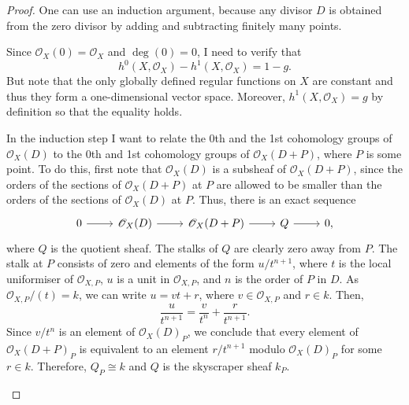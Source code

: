 \begin{proof}
  One can use an induction argument, because any divisor $D$ is
  obtained from the zero divisor by adding and subtracting finitely
  many points.

  \begin{description}[style=nextline]
    \item[base case$\big)$]
          Since $\mathscr{O}_X(0)=\mathscr{O}_{X}$ and $\deg(0)=0$,
          I need to verify that
          \[h^{0}(X, \mathscr{O}_{X})-h^{1}(X, \mathscr{O}_{X})=1-g.\]
          But note that the only globally defined regular functions
          on $X$ are constant and thus they form a one-dimensional vector
          space. Moreover, $h^{1}(X, \mathscr{O}_{X})=g$ by definition
          so that the equality holds.
    \item[induction step$\big)$]
          In the induction step I want to relate the 0th and the 1st
          cohomology groups of $\mathscr{O}_X(D)$ to the 0th and
          1st cohomology groups of $\mathscr{O}_X(D+P)$, where
          $P$ is some point. To do this, first note that
          $\mathscr{O}_X(D)$ is a subsheaf of $\mathscr{O}_X(D+P)$, since
          the orders of the sections of $\mathscr{O}_X(D+P)$ at $P$ are
          allowed to be smaller than the orders of the sections of
          $\mathscr{O}_X(D)$ at $P$. Thus, there is an exact sequence
          \[
          \begin{tikzcd}
            0\arrow{r} & \mathscr{O}_X(D)\arrow{r} & \mathscr{O}_X(D+P)\arrow{r}
            & Q\arrow{r} & 0,
          \end{tikzcd}
          \]
          where $Q$ is the quotient sheaf. The stalks of $Q$ are clearly
          zero away from $P$. The stalk at $P$ consists of zero and
          elements of the form $u/t^{n+1}$, where $t$ is the local
          uniformiser of $\mathscr{O}_{X,P}$, $u$ is a unit in
          $\mathcal{O}_{X,P}$, and $n$ is the order of $P$ in $D$.
          As $\mathcal{O}_{X,P}/(t)=k$, we can write $u=vt+r$,
          where $v\in\mathcal{O}_{X,P}$ and $r\in k$.
          Then,
          \[\frac{u}{t^{n+1}}=\frac{v}{t^n}+\frac{r}{t^{n+1}}.\]
          Since $v/t^n$ is an element of $\mathscr{O}_X(D)_{P}$, we conclude
          that every element of $\mathscr{O}_X(D+P)_{P}$ is equivalent to
          an element $r/t^{n+1}$ modulo $\mathscr{O}_X(D)_{P}$ for some
          $r\in k$. Therefore, $Q_{P}\cong k$ and $Q$ is the skyscraper sheaf
          $k_{P}$.


\end{description}
\end{proof}
